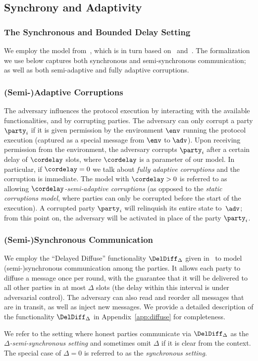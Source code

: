 \subsection{Synchrony and Adaptivity}

\subsubsection{The Synchronous and Bounded Delay Setting}

We employ the model from~\cite{praos}, which is in turn based
on~\cite{ouroboros} and~\cite{backbone}.
The formalization we use below captures both synchronous and semi-syn\-chronous
communication; as well as both semi-adaptive and fully adaptive corruptions.

\subsubsection{(Semi-)Adaptive Corruptions}
\label{sec:prelim-corr}

The adversary  influences the protocol execution by interacting
with the available functionalities, and by corrupting parties.
The adversary can only corrupt a party $\party_i$ if it is given
permission by the environment $\env$ running the protocol execution (captured as
a special message from $\env$ to $\adv$).
Upon receiving permission from the environment, the adversary
corrupts $\party_i$ after a certain delay of $\cordelay$ slots, where $\cordelay$ is
a parameter of our model. In particular, if $\cordelay=0$ we talk about
\emph{fully adaptive corruptions} and the corruption is immediate.
The model with $\cordelay>0$ is
referred to as allowing \emph{$\cordelay$-semi-adaptive corruptions} (as opposed to the
\emph{static corruptions model}, where parties can only be corrupted before the
start of the execution).
%
A corrupted
party $\party_i$ will relinquish its entire state to~$\adv$;
from this point on, the adversary will be activated in place of the
party $\party_i$.

\subsubsection{(Semi-)Synchronous Communication}
\label{sec:prelim-comm}

We employ the ``Delayed Diffuse'' functionality $\DelDiff_\Delta$ given in~\cite{praos} to
model (semi-)synchronous communication among the parties. It allows each party
to diffuse a message once per round, with the guarantee that it will be
delivered to all other parties in at most $\Delta$ slots (the delay within this
interval is under adversarial control). The adversary can also read and reorder
all messages that are in transit, as well as inject new messages.
We provide a detailed description of the functionality $\DelDiff_\Delta$ in
Appendix~\ref{app:diffuse} for completeness.

We refer to the setting where honest parties communicate via $\DelDiff_\Delta$
as the \emph{$\Delta$-semi-synchronous setting} and sometimes omit $\Delta$ if
it is clear from the context. The special case of $\Delta=0$ is referred to as
the \emph{synchronous setting}.
